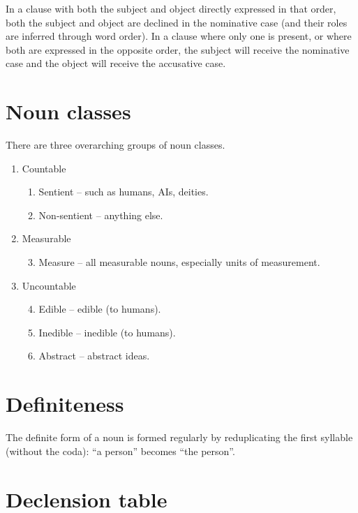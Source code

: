 \documentclass{book}
\begin{document}
In a clause with both the subject and object directly expressed in that order, both the subject and object are declined in the nominative case (and their roles are inferred through word order). In a clause where only one is present, or where both are expressed in the opposite order, the subject will receive the nominative case and the object will receive the accusative case.

\section{Noun classes}

There are three overarching groups of noun classes.

\begin{enumerate}
  \item Countable
  \begin{enumerate}
      \item Sentient -- such as humans, AIs, deities.
      \item Non-sentient -- anything else.
  \end{enumerate}
  \item Measurable
  \begin{enumerate}
      \setcounter{enumi}{2}
      \item Measure -- all measurable nouns, especially units of measurement.
  \end{enumerate}
  \item Uncountable
  \begin{enumerate}
      \setcounter{enumi}{3}
      \item Edible -- edible (to humans).
      \item Inedible -- inedible (to humans).
      \item Abstract -- abstract ideas.
  \end{enumerate}
\end{enumerate}

\section{Definiteness}

The definite form of a noun is formed regularly by reduplicating the first syllable (without the coda):  ``a person'' becomes  ``the person''.

\section{Declension table}
\end{document}
